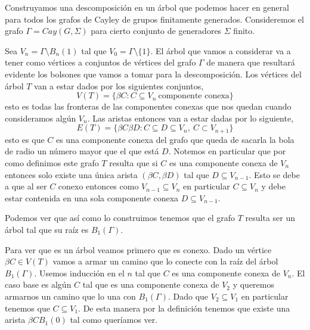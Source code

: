 \documentclass[tesis.tex]{subfiles}
\begin{document}
\begin{ej}\label{desc-grafo-cayley}%
	
	Construyamos una descomposición en un árbol que podemos hacer en general para todos los grafos de Cayley de grupos finitamente generados. 
	Consideremos el grafo $\Gamma = Cay(G,\Sigma)$ para cierto conjunto de generadores $\Sigma$ finito.
	
	Sea $V_n = \Gamma \setminus B_n(1) $ tal que $V_0 = \Gamma \setminus \{1\}$. 
	El árbol que vamos a considerar va a tener como vértices a conjuntos de vértices del grafo $\Gamma$ de manera que resultará evidente los bolsones que vamos a tomar para la descomposición. 
	Los vértices del árbol $T$ van a estar dados por los siguientes conjuntos,
	\[
	V(T) = \{  \beta C : C \subseteq V_n \ \text{componente conexa}   \}
	\]
	esto es todas las fronteras de las componentes conexas que nos quedan cuando consideramos algún $V_n$. 
	Las aristas entonces van a estar dadas por lo siguiente,
	\[
	E(T) = \{ \beta C \beta D : C \subseteq D \subseteq V_n, \ C \subset V_{n+1}   \}
	\]
	esto es que $C$ es una componente conexa del grafo que queda de sacarla la bola de radio un número mayor que el que está $D$.
	Notemos en particular que por como definimos este grafo $T$ resulta que si $C$ es una componente conexa de $V_n$ entonces solo existe una única arista $(\beta C, \beta D)$ tal que $D \subseteq V_{n-1}$. 
	Esto se debe a que al ser $C$ conexo entonces como $V_{n-1} \subseteq V_{n}$ en particular $C \subseteq V_{n}$ y debe estar contenida en una sola componente conexa $D \subseteq V_{n-1}.$
	
	
	Podemos ver que así como lo construimos tenemos que el grafo $T$ resulta ser un árbol tal que su raíz es $B_1(\Gamma)$. 
	
	Para ver que es un árbol veamos primero que es conexo. Dado un vértice $\beta C \in V(T)$ vamos a armar un camino que lo conecte con la raíz del árbol $B_1(\Gamma)$. 
	Usemos inducción en el $n$ tal que $C$ es una componente conexa de $V_n$. 
	El caso base es algún $C$ tal que es una componente conexa de $V_2$ y queremos armarnos un camino que lo una con $B_1(\Gamma)$. 
	Dado que $V_2 \subseteq V_1$ en particular tenemos que $C \subseteq V_1$. De esta manera por la definición tenemos que existe una arista $\beta CB_1(0)$ tal como queríamos ver.
	

\end{ej}
\end{document}
